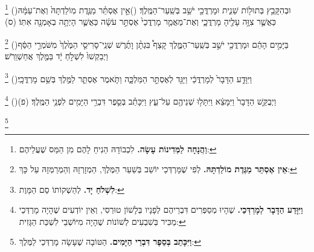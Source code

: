 \documentclass[12pt, openany]{book}
\newcommand{\footnotecomment}[1]{
	\renewcommand\thefootnote{}
	\footnote{\textsf{#1}}}
\newcommand{\commenta}[1]{\footnotecomment{#1}\hspace{0em}}
\newcommand{\vsnum}[1]{(\hebrewnumeral{#1})\space}
\begin{document}
\begin{multicols}{2}
\commenta{\textrm{\textbf{וַהֲנָחָה לַמְּדִינוֹת עָשָׂה.}} לִכְבוֹדָהּ הֵנִיחַ לָהֶם מִן הַמַּס שֶׁעֲלֵיהֶם:}%
\vsnum{19}וּבְהִקָּבֵ֥ץ בְּתוּל֖וֹת שֵׁנִ֑ית וּמָרְדֳּכַ֖י יֹשֵׁ֥ב בְּשַֽׁעַר־הַמֶּֽלֶךְ׃
\vsnum{20}אֵ֣ין אֶסְתֵּ֗ר מַגֶּ֤דֶת מֽוֹלַדְתָּהּ֙ וְאֶת־עַמָּ֔הּ כַּאֲשֶׁ֛ר צִוָּ֥ה עָלֶ֖יהָ מָרְדֳּכָ֑י וְאֶת־מַאֲמַ֤ר מָרְדֳּכַי֙ אֶסְתֵּ֣ר עֹשָׂ֔ה כַּאֲשֶׁ֛ר הָיְתָ֥ה בְאָמְנָ֖ה אִתּֽוֹ׃ (ס)%
\commenta{\textrm{\textbf{אֵין אֶסְתֵּר מַגֶּדֶת מוֹלַדְתָּהּ.}} לְפִי שֶׁמָּרְדְּכַי יוֹשֵׁב בְּשַׁעַר הַמֶּלֶךְ, הַמְזָרְזָהּ וְהַמְרַמְּזָהּ עַל כָּךְ: }%
\vsnum{21}בַּיָּמִ֣ים הָהֵ֔ם וּמָרְדֳּכַ֖י יֹשֵׁ֣ב בְּשַֽׁעַר־הַמֶּ֑לֶךְ קָצַף֩ בִּגְתָ֨ן וָתֶ֜רֶשׁ שְׁנֵֽי־סָרִיסֵ֤י הַמֶּ֙לֶךְ֙ מִשֹּׁמְרֵ֣י הַסַּ֔ף וַיְבַקְשׁוּ֙ לִשְׁלֹ֣חַ יָ֔ד בַּמֶּ֖לֶךְ אֲחַשְׁוֵֽרֹשׁ׃%
\commenta{\textrm{\textbf{לִשְׁלֹחַ יָד.}} לְהַשְׁקוֹתוֹ סַם הַמָּוֶת:}%
\vsnum{22}וַיִּוָּדַ֤ע הַדָּבָר֙ לְמָרְדֳּכַ֔י וַיַּגֵּ֖ד לְאֶסְתֵּ֣ר הַמַּלְכָּ֑ה וַתֹּ֧אמֶר אֶסְתֵּ֛ר לַמֶּ֖לֶךְ בְּשֵׁ֥ם מָרְדֳּכָֽי׃%
\commenta{\textrm{\textbf{וַיִּוָּדַע הַדָּבָר לְמָרְדְּכַי.}} שֶׁהָיוּ מְסַפְּרִים דִּבְרֵיהֶם לְפָנָיו בְּלָשׁוֹן טוּרְסִי, וְאֵין יוֹדְעִים שֶׁהָיָה מָרְדְּכַי מַכִּיר בְּשִׁבְעִים לְשׁוֹנוֹת שֶׁהָיָה מִיּוֹשְׁבֵי לִשְׁכַּת הַגָּזִית: }%
\vsnum{23}וַיְבֻקַּ֤שׁ הַדָּבָר֙ וַיִּמָּצֵ֔א וַיִּתָּל֥וּ שְׁנֵיהֶ֖ם עַל־עֵ֑ץ וַיִּכָּתֵ֗ב בְּסֵ֛פֶר דִּבְרֵ֥י הַיָּמִ֖ים לִפְנֵ֥י הַמֶּֽלֶךְ׃ (פ)%
\commenta{\textrm{\textbf{וַיִּכָּתֵב בְּסֵפֶר דִּבְרֵי הַיָּמִים.}} הַטּוֹבָה שֶׁעָשָׂה מָרְדְּכַי לַמֶּלֶךְ:}%
\end{multicols}\newpage
\end{document}
